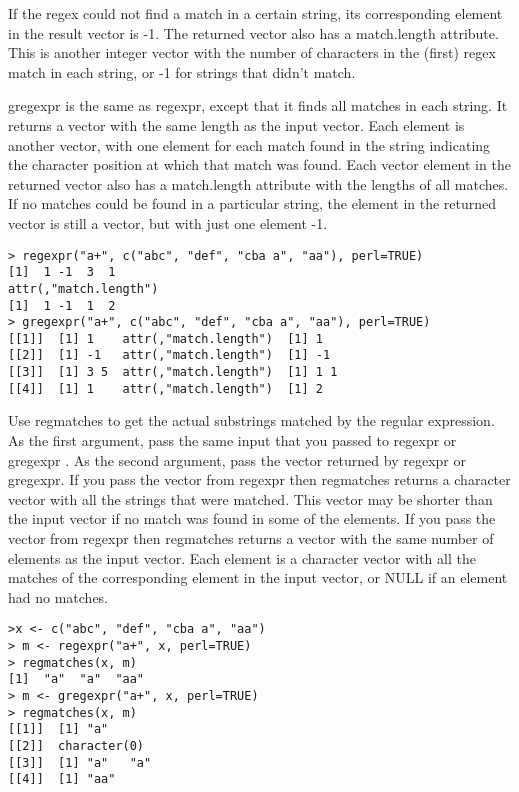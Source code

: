 \documentclass{article}
\begin{document}
If the regex could not find a match in a certain string, its corresponding element in the result vector is -1. The returned vector also has a match.length attribute. This is another integer vector with the number of characters in the (first) regex match in each string, or -1 for strings that didn't match.

gregexpr is the same as regexpr, except that it finds all matches in each string. It returns a vector with the same length as the input vector. Each element is another vector, with one element for each match found in the string indicating the character position at which that match was found. Each vector element in the returned vector also has a match.length attribute with the lengths of all matches. If no matches could be found in a particular string, the element in the returned vector is still a vector, but with just one element -1.
\begin{framed}
\begin{verbatim}
> regexpr("a+", c("abc", "def", "cba a", "aa"), perl=TRUE)
[1]  1 -1  3  1
attr(,"match.length")
[1]  1 -1  1  2
> gregexpr("a+", c("abc", "def", "cba a", "aa"), perl=TRUE)
[[1]]  [1] 1    attr(,"match.length")  [1] 1
[[2]]  [1] -1   attr(,"match.length")  [1] -1
[[3]]  [1] 3 5  attr(,"match.length")  [1] 1 1
[[4]]  [1] 1    attr(,"match.length")  [1] 2
\end{verbatim}
\end{framed}
Use regmatches to get the actual substrings matched by the regular expression. As the first argument, pass the same input that you passed to regexpr or gregexpr . As the second argument, pass the vector returned by regexpr or gregexpr. If you pass the vector from regexpr then regmatches returns a character vector with all the strings that were matched. This vector may be shorter than the input vector if no match was found in some of the elements. If you pass the vector from regexpr then regmatches returns a vector with the same number of elements as the input vector. Each element is a character vector with all the matches of the corresponding element in the input vector, or NULL if an element had no matches.
\begin{framed}
\begin{verbatim}
>x <- c("abc", "def", "cba a", "aa")
> m <- regexpr("a+", x, perl=TRUE)
> regmatches(x, m)
[1]  "a"  "a"  "aa"
> m <- gregexpr("a+", x, perl=TRUE)
> regmatches(x, m)
[[1]]  [1] "a"
[[2]]  character(0)
[[3]]  [1] "a"   "a"
[[4]]  [1] "aa"
\end{verbatim}
\end{framed}
\end{document}
